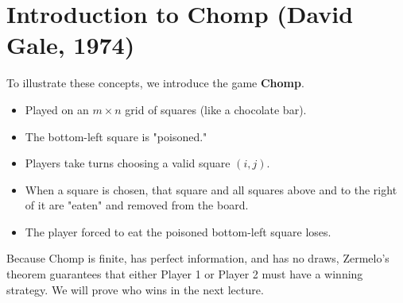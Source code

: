 \documentclass[12pt, a4paper]{article}
\begin{document}
\section{Introduction to Chomp (David Gale, 1974)}

To illustrate these concepts, we introduce the game \textbf{Chomp}.
\begin{itemize}
    \item Played on an $m \times n$ grid of squares (like a chocolate bar).
    \item The bottom-left square is "poisoned."
    \item Players take turns choosing a valid square $(i,j)$. 
    \item When a square is chosen, that square and all squares above and to the right of it are "eaten" and removed from the board.
    \item The player forced to eat the poisoned bottom-left square loses.
\end{itemize}
Because Chomp is finite, has perfect information, and has no draws, Zermelo's theorem guarantees that either Player 1 or Player 2 must have a winning strategy. We will prove who wins in the next lecture.
\end{document}
